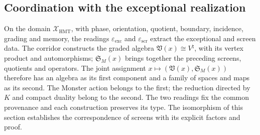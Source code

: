 \subsection{Coordination with the exceptional realization}

On the domain \(\mathcal X_{\mathrm{HMT}}\), with phase, orientation,
quotient, boundary, incidence, grading and memory, the readings
\(\varepsilon_{\mathrm{exc}}\) and \(\varepsilon_{\mathrm{scr}}\) extract
the exceptional and screen data. The corridor constructs the graded
algebra \(\mathfrak V(x)\cong V^\natural\), with its vertex product
and automorphisms; \(\mathfrak S_M(x)\) brings together the preceding screens, quotients
and operators. The joint assignment
\(x\mapsto(\mathfrak V(x),\mathfrak S_M(x))\) therefore has an
algebra as its first component and a family of spaces and maps as its second.
The Monster action belongs to the first; the reduction directed by \(K\)
and compact duality belong to the second. The two readings fix the common
provenance and each construction preserves its type.
The isomorphism of this section establishes the correspondence of
screens with its explicit factors and
proof.
